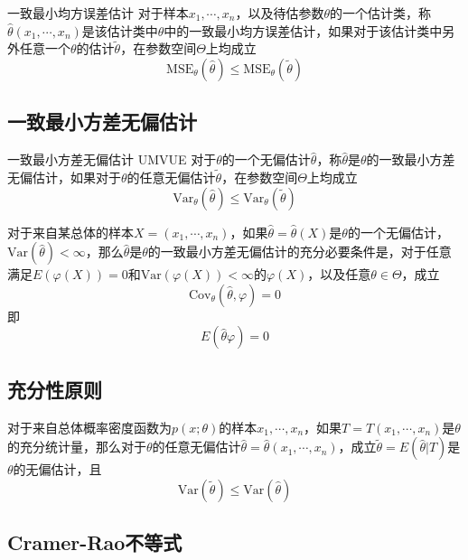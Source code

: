 \documentclass[lang = cn, scheme = chinese, thmcnt = section]{elegantbook}
\begin{document}
\begin{definition}{一致最小均方误差估计}
	对于样本$x_1,\cdots,x_n$，以及待估参数$\theta$的一个估计类，称$\hat{\theta}(x_1,\cdots,x_n)$是该估计类中$\theta$中的一致最小均方误差估计，如果对于该估计类中另外任意一个$\theta$的估计$\tilde{\theta}$，在参数空间$\Theta$上均成立
	$$
	\mathrm{MSE}_{\theta}(\hat{\theta})\le\mathrm{MSE}_{\theta}(\tilde{\theta})
	$$
\end{definition}

\subsection{一致最小方差无偏估计}

\begin{definition}{一致最小方差无偏估计 UMVUE}
	对于$\theta$的一个无偏估计$\hat{\theta}$，称$\hat{\theta}$是$\theta$的一致最小方差无偏估计，如果对于$\theta$的任意无偏估计$\tilde{\theta}$，在参数空间$\Theta$上均成立
	$$
	\mathrm{Var}_{\theta}(\hat{\theta})\le\mathrm{Var}_{\theta}(\tilde{\theta})
	$$
\end{definition}

\begin{theorem}
	对于来自某总体的样本$X=(x_1,\cdots,x_n)$，如果$\hat{\theta}=\hat{\theta}(X)$是$\theta$的一个无偏估计，$\mathrm{Var}(\hat{\theta})<\infty$，那么$\hat{\theta}$是$\theta$的一致最小方差无偏估计的充分必要条件是，对于任意满足$E(\varphi(X))=0$和$\mathrm{Var}(\varphi(X))<\infty$的$\varphi(X)$，以及任意$\theta\in\Theta$，成立
	$$
	\mathrm{Cov}_{\theta}(\hat{\theta},\varphi)=0
	$$
	即
	$$
	E(\hat{\theta}\varphi)=0
	$$
\end{theorem}

\subsection{充分性原则}

\begin{theorem}
	对于来自总体概率密度函数为$p(x;\theta)$的样本$x_1,\cdots,x_n$，如果$T=T(x_1,\cdots,x_n)$是$\theta$的充分统计量，那么对于$\theta$的任意无偏估计$\hat{\theta}=\hat{\theta}(x_1,\cdots,x_n)$，成立$\tilde{\theta}=E(\hat{\theta}|T)$是$\theta$的无偏估计，且
	$$
	\mathrm{Var}(\tilde{\theta})\le\mathrm{Var}(\hat{\theta})
	$$
\end{theorem}

\subsection{Cramer-Rao不等式}
\end{document}
